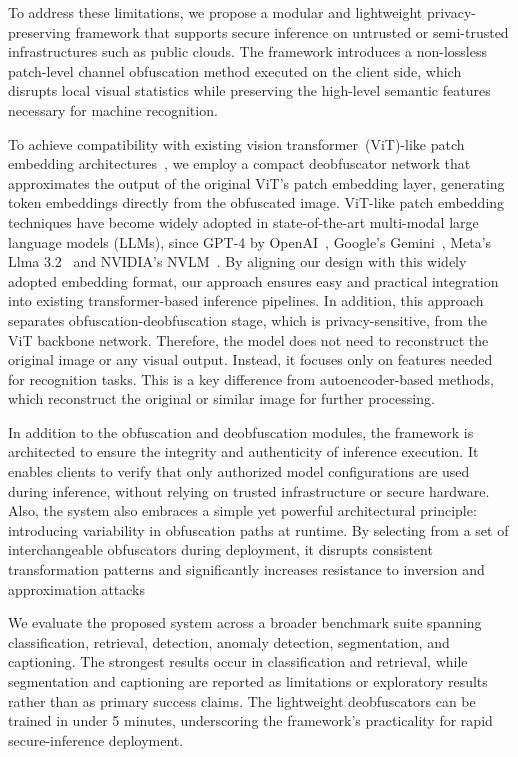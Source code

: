 \documentclass{ieeeaccess}
\newcommand{\rev}[1]{{\color{black}#1}}
\begin{document}
To address these limitations, we propose a modular and lightweight privacy-preserving framework that supports secure inference on untrusted or semi-trusted infrastructures such as public clouds. \rev{The framework introduces a non-lossless patch-level channel obfuscation method executed on the client side, which disrupts local visual statistics while preserving the high-level semantic features necessary for machine recognition.}

To achieve compatibility with existing vision transformer~(ViT)-like patch embedding architectures~\cite{dosovitskiy2020vit}, we employ a compact deobfuscator network that approximates the output of the original ViT's patch embedding layer, generating token embeddings directly from the obfuscated image. ViT-like patch embedding techniques have become widely adopted in state-of-the-art multi-modal large language models (LLMs), since GPT-4 by OpenAI~\cite{2023GPT4VisionSC}, Google's Gemini~\cite{geminiteam2025geminifamilyhighlycapable}, Meta's Llma 3.2~\cite{meta2024llama3} and NVIDIA's NVLM~\cite{dai2024nvlmopenfrontierclassmultimodal}. By aligning our design with this widely adopted embedding format, our approach ensures easy and practical integration into existing transformer-based inference pipelines. In addition, this approach separates obfuscation-deobfuscation stage, which is privacy-sensitive, from the ViT backbone network. Therefore, the model does not need to reconstruct the original image or any visual output. Instead, it focuses only on features needed for recognition tasks. This is a key difference from autoencoder-based methods, which reconstruct the original or similar image for further processing.

In addition to the obfuscation and deobfuscation modules, the framework is architected to ensure the integrity and authenticity of inference execution. It enables clients to verify that only authorized model configurations are used during inference, without relying on trusted infrastructure or secure hardware. Also, the system also embraces a simple yet powerful architectural principle: introducing variability in obfuscation paths at runtime. By selecting from a set of interchangeable obfuscators during deployment, it disrupts consistent transformation patterns and significantly increases resistance to inversion and approximation attacks

\rev{We evaluate the proposed system across a broader benchmark suite spanning classification, retrieval, detection, anomaly detection, segmentation, and captioning. The strongest results occur in classification and retrieval, while segmentation and captioning are reported as limitations or exploratory results rather than as primary success claims. The lightweight deobfuscators can be trained in under 5 minutes, underscoring the framework's practicality for rapid secure-inference deployment.}
\end{document}
